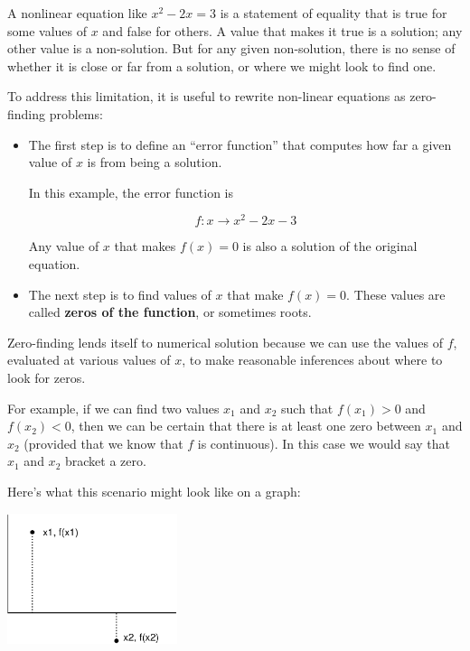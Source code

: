 \documentclass[
]{book}
\begin{document}
A nonlinear equation like $x^2 - 2x = 3$ is a statement of
equality that is true for some values of $x$ and false for
others.  A value that makes it true is a solution;
any other value is a non-solution.  But for any given non-solution,
there is no sense of whether it is close or far from a solution,
or where we might look to find one.

To address this limitation, it is useful to
rewrite non-linear equations as zero-finding problems:

\begin{itemize}

\item The first step is to define
an ``error function'' that computes how far
a given value of $x$ is from being a solution.

In this example, the error function is

\begin{equation}
f : x \to x^2 - 2x -3
\end{equation}

Any value of $x$ that makes $f(x) = 0$ is also a solution
of the original equation.

\item The next step is to find values of $x$ that make
$f(x) = 0$.  These values are called {\bf zeros of the
function}, or sometimes roots.

\end{itemize}

Zero-finding lends itself to numerical solution because we can
use the values of $f$, evaluated at various values of $x$, to
make reasonable inferences about where to look for zeros.

For example, if we can find two values $x_1$ and $x_2$ such that
$f(x_1) > 0$ and $f(x_2) < 0$, then we can be certain that there is at
least one zero between $x_1$ and $x_2$ (provided that we know that $f$
is continuous).  In this case we would say that $x_1$ and $x_2$
bracket a zero.

Here's what this scenario might look like on a graph:

\beforefig \centerline{\includegraphics[height=1.5in]{figs/secant.eps}}
\end{document}
